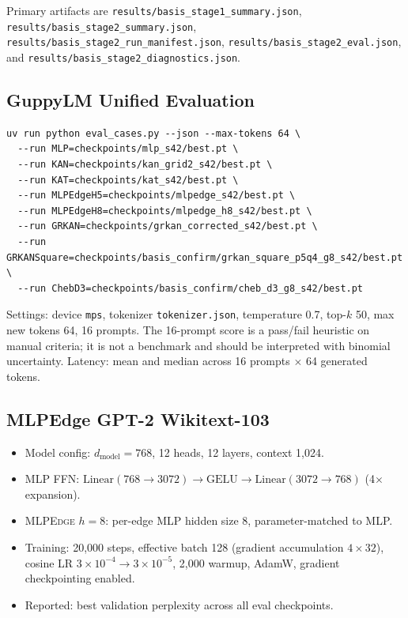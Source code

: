 \documentclass{article}
\newcommand{\mlpedge}{\textsc{MLPEdge}}
\begin{document}
Primary artifacts are \texttt{results/basis\_stage1\_summary.json},
\texttt{results/basis\_stage2\_summary.json},
\texttt{results/basis\_stage2\_run\_manifest.json},
\texttt{results/basis\_stage2\_eval.json}, and
\texttt{results/basis\_stage2\_diagnostics.json}.

\subsection{GuppyLM Unified Evaluation}

\begin{verbatim}
uv run python eval_cases.py --json --max-tokens 64 \
  --run MLP=checkpoints/mlp_s42/best.pt \
  --run KAN=checkpoints/kan_grid2_s42/best.pt \
  --run KAT=checkpoints/kat_s42/best.pt \
  --run MLPEdgeH5=checkpoints/mlpedge_s42/best.pt \
  --run MLPEdgeH8=checkpoints/mlpedge_h8_s42/best.pt \
  --run GRKAN=checkpoints/grkan_corrected_s42/best.pt \
  --run GRKANSquare=checkpoints/basis_confirm/grkan_square_p5q4_g8_s42/best.pt \
  --run ChebD3=checkpoints/basis_confirm/cheb_d3_g8_s42/best.pt
\end{verbatim}

Settings: device \texttt{mps}, tokenizer \texttt{tokenizer.json},
temperature 0.7, top-$k$ 50, max new tokens 64, 16 prompts.
The 16-prompt score is a pass/fail heuristic on manual criteria;
it is not a benchmark and should be interpreted with binomial uncertainty.
Latency: mean and median across 16 prompts $\times$ 64 generated tokens.

\subsection{MLPEdge GPT-2 Wikitext-103}

\begin{itemize}
  \item Model config: $d_\text{model}=768$, 12 heads, 12 layers, context 1,024.
  \item MLP FFN: $\text{Linear}(768{\to}3072) \to \text{GELU} \to \text{Linear}(3072{\to}768)$ (4$\times$ expansion).
  \item \mlpedge{} $h=8$: per-edge MLP hidden size 8, parameter-matched to MLP.
  \item Training: 20,000 steps, effective batch 128 (gradient accumulation $4 \times 32$),
    cosine LR $3\times10^{-4} \to 3\times10^{-5}$, 2,000 warmup, AdamW,
    gradient checkpointing enabled.
  \item Reported: best validation perplexity across all eval checkpoints.
\end{itemize}
\end{document}
